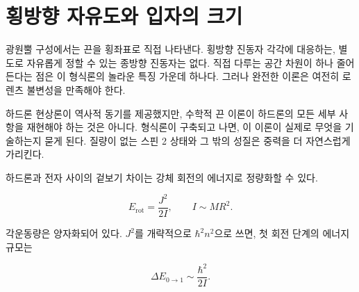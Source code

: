 \section{횡방향 자유도와 입자의 크기}

광원뿔 구성에서는 끈을 횡좌표로 직접 나타낸다. 횡방향 진동자 각각에 대응하는, 별도로 자유롭게 정할 수 있는 종방향 진동자는 없다. 직접 다루는 공간 차원이 하나 줄어든다는 점은 이 형식론의 놀라운 특징 가운데 하나다. 그러나 완전한 이론은 여전히 로렌츠 불변성을 만족해야 한다.

\begin{classroomqa}
\end{classroomqa}

\begin{classroomqa}
\end{classroomqa}

하드론 현상론이 역사적 동기를 제공했지만, 수학적 끈 이론이 하드론의 모든 세부 사항을 재현해야 하는 것은 아니다. 형식론이 구축되고 나면, 이 이론이 실제로 무엇을 기술하는지 묻게 된다. 질량이 없는 스핀 2 상태와 그 밖의 성질은 중력을 더 자연스럽게 가리킨다.

하드론과 전자 사이의 겉보기 차이는 강체 회전의 에너지로 정량화할 수 있다.

\begin{equation}
  E_{\mathrm{rot}}=\frac{J^2}{2I},
  \qquad
  I\sim MR^2.
  \label{eq:l01-rotational-energy}
\end{equation}

각운동량은 양자화되어 있다. \(J^2\)를 개략적으로 \(\hbar^2 n^2\)으로 쓰면, 첫 회전 단계의 에너지 규모는

\begin{equation}
  \Delta E_{0\to1}\sim\frac{\hbar^2}{2I}.
  \label{eq:l01-first-rotational-step}
\end{equation}

